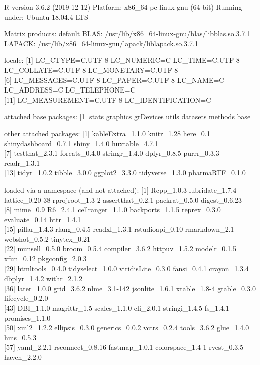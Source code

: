 \documentclass[]{article}
\begin{document}
R version 3.6.2 (2019-12-12) Platform: x86\_64-pc-linux-gnu (64-bit)
Running under: Ubuntu 18.04.4 LTS

Matrix products: default BLAS:
/usr/lib/x86\_64-linux-gnu/blas/libblas.so.3.7.1 LAPACK:
/usr/lib/x86\_64-linux-gnu/lapack/liblapack.so.3.7.1

locale: {[}1{]} LC\_CTYPE=C.UTF-8 LC\_NUMERIC=C LC\_TIME=C.UTF-8
LC\_COLLATE=C.UTF-8 LC\_MONETARY=C.UTF-8\\
{[}6{]} LC\_MESSAGES=C.UTF-8 LC\_PAPER=C.UTF-8 LC\_NAME=C LC\_ADDRESS=C
LC\_TELEPHONE=C\\
{[}11{]} LC\_MEASUREMENT=C.UTF-8 LC\_IDENTIFICATION=C

attached base packages: {[}1{]} stats graphics grDevices utils datasets
methods base

other attached packages: {[}1{]} kableExtra\_1.1.0 knitr\_1.28 here\_0.1
shinydashboard\_0.7.1 shiny\_1.4.0 huxtable\_4.7.1\\
{[}7{]} testthat\_2.3.1 forcats\_0.4.0 stringr\_1.4.0 dplyr\_0.8.5
purrr\_0.3.3 readr\_1.3.1\\
{[}13{]} tidyr\_1.0.2 tibble\_3.0.0 ggplot2\_3.3.0 tidyverse\_1.3.0
pharmaRTF\_0.1.0

loaded via a namespace (and not attached): {[}1{]} Rcpp\_1.0.3
lubridate\_1.7.4 lattice\_0.20-38 rprojroot\_1.3-2 assertthat\_0.2.1
packrat\_0.5.0 digest\_0.6.23\\
{[}8{]} mime\_0.9 R6\_2.4.1 cellranger\_1.1.0 backports\_1.1.5
reprex\_0.3.0 evaluate\_0.14 httr\_1.4.1\\
{[}15{]} pillar\_1.4.3 rlang\_0.4.5 readxl\_1.3.1 rstudioapi\_0.10
rmarkdown\_2.1 webshot\_0.5.2 tinytex\_0.21\\
{[}22{]} munsell\_0.5.0 broom\_0.5.4 compiler\_3.6.2 httpuv\_1.5.2
modelr\_0.1.5 xfun\_0.12 pkgconfig\_2.0.3\\
{[}29{]} htmltools\_0.4.0 tidyselect\_1.0.0 viridisLite\_0.3.0
fansi\_0.4.1 crayon\_1.3.4 dbplyr\_1.4.2 withr\_2.1.2\\
{[}36{]} later\_1.0.0 grid\_3.6.2 nlme\_3.1-142 jsonlite\_1.6.1
xtable\_1.8-4 gtable\_0.3.0 lifecycle\_0.2.0\\
{[}43{]} DBI\_1.1.0 magrittr\_1.5 scales\_1.1.0 cli\_2.0.1
stringi\_1.4.5 fs\_1.4.1 promises\_1.1.0\\
{[}50{]} xml2\_1.2.2 ellipsis\_0.3.0 generics\_0.0.2 vctrs\_0.2.4
tools\_3.6.2 glue\_1.4.0 hms\_0.5.3\\
{[}57{]} yaml\_2.2.1 rsconnect\_0.8.16 fastmap\_1.0.1 colorspace\_1.4-1
rvest\_0.3.5 haven\_2.2.0
\end{document}
